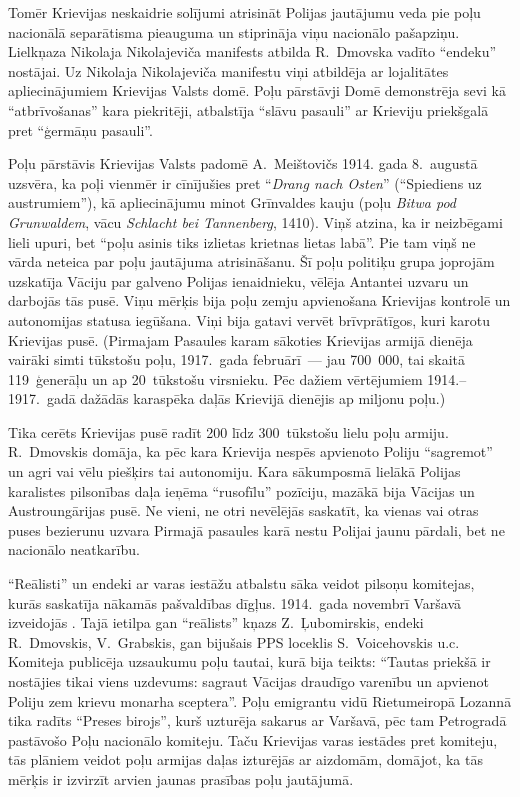 \documentclass[twoside,a5paper,12pt,fleqn,openany]{extbook}
\newcommand{\pltxti}[1]{\textit{\textpolish{#1}}}
\newcommand{\detxti}[1]{\textit{\textgerman{#1}}}
\begin{document}
Tomēr Krievijas neskaidrie solījumi atrisināt Polijas jautājumu veda pie poļu nacionālā separātisma pieauguma un stiprināja viņu nacionālo pašapziņu. Lielkņaza Nikolaja Nikolajeviča manifests atbilda R.~Dmovska vadīto ``endeku'' nostājai. Uz Nikolaja Nikolajeviča manifestu viņi atbildēja ar lojalitātes apliecinājumiem Krievijas Valsts domē. Poļu pārstāvji Domē demonstrēja sevi kā ``atbrīvošanas'' kara piekritēji, atbalstīja ``slāvu pasauli'' ar Krieviju priekšgalā pret ``ģermāņu pasauli''.

Poļu pārstāvis Krievijas Valsts padomē A.~Meištovičs 1914. gada 8.~augustā uzsvēra, ka poļi vienmēr ir cīnījušies pret ``\detxti{Drang nach Osten}'' (``Spiediens uz austrumiem''), kā apliecinājumu minot Grīnvaldes kauju (poļu \pltxti{Bitwa pod Grunwaldem}, vācu \detxti{Schlacht bei Tannenberg}, 1410). Viņš atzina, ka ir neizbēgami lieli upuri, bet ``poļu asinis tiks izlietas krietnas lietas labā''. Pie tam viņš ne vārda neteica par poļu jautājuma atrisināšanu. Šī poļu politiķu grupa joprojām uzskatīja Vāciju par galveno Polijas ienaidnieku, vēlēja Antantei uzvaru un darbojās tās pusē. Viņu mērķis bija poļu zemju apvienošana Krievijas kontrolē un autonomijas statusa iegūšana. Viņi bija gatavi vervēt brīvprātīgos, kuri karotu Krievijas pusē. (Pirmajam Pasaules karam sākoties Krievijas armijā dienēja vairāki simti tūkstošu poļu, 1917.~gada februārī~--- jau 700~000, tai skaitā 119~ģenerāļu un ap 20~tūkstošu virsnieku. Pēc dažiem vērtējumiem 1914.--1917.~gadā dažādās karaspēka daļās Krievijā dienējis ap miljonu poļu.)

Tika cerēts Krievijas pusē radīt 200 līdz 300~tūkstošu lielu poļu armiju. R.~Dmovskis domāja, ka pēc kara Krievija nespēs apvienoto Poliju ``sagremot'' un agri vai vēlu piešķirs tai autonomiju. Kara sākumposmā lielākā Polijas karalistes pilsonības daļa ieņēma ``rusofīlu'' pozīciju, mazākā bija Vācijas un Austroungārijas pusē. Ne vieni, ne otri nevēlējās saskatīt, ka vienas vai otras puses bezierunu uzvara Pirmajā pasaules karā nestu Polijai jaunu pārdali, bet ne nacionālo neatkarību.

``Reālisti'' un endeki ar varas iestāžu atbalstu sāka veidot pilsoņu komitejas, kurās saskatīja nākamās pašvaldības dīgļus. 1914.~gada novembrī Varšavā izveidojās . Tajā ietilpa gan ``reālists'' kņazs Z.~Ļubomirskis, endeki R.~Dmovskis, V.~Grabskis, gan bijušais PPS loceklis S.~Voicehovskis u.c. Komiteja publicēja uzsaukumu poļu tautai, kurā bija teikts: ``Tautas priekšā ir nostājies tikai viens uzdevums: sagraut Vācijas draudīgo varenību un apvienot Poliju zem krievu monarha sceptera''. Poļu emigrantu vidū Rietumeiropā Lozannā tika radīts ``Preses birojs'', kurš uzturēja sakarus ar Varšavā, pēc tam Petrogradā pastāvošo Poļu nacionālo komiteju. Taču Krievijas varas iestādes pret komiteju, tās plāniem veidot poļu armijas daļas izturējās ar aizdomām, domājot, ka tās mērķis ir izvirzīt arvien jaunas prasības poļu jautājumā.
\end{document}
